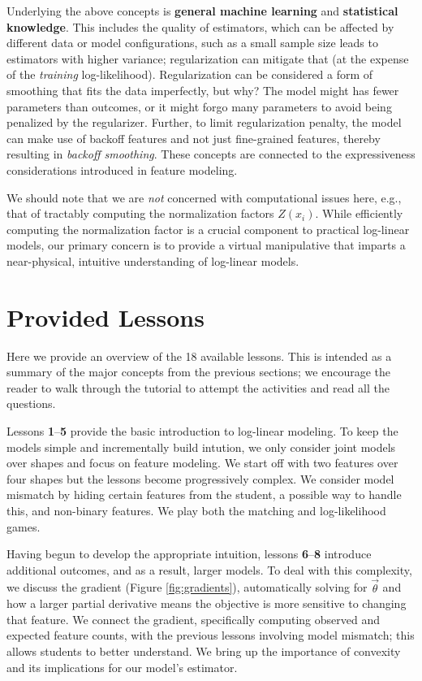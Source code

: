 \documentclass[11pt,letterpaper]{article}
\newcommand{\Note}[1]{}
\renewcommand{\Note}[1]{\hl{[#1]}}  %
\newcommand{\NoteSigned}[3]{{\sethlcolor{#2}\Note{#1: #3}}}
\newcommand{\NoteFF}[1]{\NoteSigned{FF}{LightBlue}{#1}}
\newcommand{\NumLessons}[0]{18}%
\begin{document}
Underlying the above concepts is \textbf{general machine learning} and 
\textbf{statistical knowledge}. This includes the quality of estimators, 
which can be affected by different data or model configurations, such 
as a small sample size leads to estimators with 
higher variance; regularization can mitigate that (at the expense of 
the \textit{training} log-likelihood). 
Regularization can be considered a form of smoothing that fits the data 
imperfectly, but why? The model might has fewer parameters than 
outcomes, or it might forgo many parameters to avoid being penalized by 
the regularizer.  Further, to limit regularization penalty, the model can make 
use of backoff features and not just fine-grained features, thereby resulting 
in \textit{backoff smoothing}. These concepts are connected to the expressiveness 
considerations introduced in feature modeling.

We should note that we are \textit{not} concerned with computational issues here, e.g., that of tractably computing the normalization factors $Z(x_i)$. While efficiently computing the normalization factor is a crucial component to practical log-linear models, our primary concern is to provide a virtual manipulative that imparts a near-physical, intuitive understanding of log-linear models. 



\section{Provided Lessons}\label{sec:lessons}
Here we provide an overview of the \NumLessons{} available lessons. This is intended as a 
summary of the major concepts from the previous sections; we encourage the reader to 
walk through the tutorial to attempt the activities and read all the questions.

Lessons \textbf{1}--\textbf{5} provide the basic introduction to log-linear modeling. To keep 
the models simple and incrementally build intution, we only consider joint models over shapes and focus 
on feature modeling. We start off with two features over four shapes but the lessons 
become progressively complex. We consider model mismatch by hiding certain 
features from the student, a possible way to handle this, and non-binary features. We play both the 
matching and log-likelihood games.

Having begun to develop the appropriate intuition, lessons \textbf{6}--\textbf{8} introduce 
additional outcomes, and as a result, larger models. To deal with this complexity, we discuss the gradient 
(Figure \ref{fig:gradients}), 
automatically solving for $\vec{\theta}$ and how a larger partial derivative means the objective is more 
sensitive to changing that feature. We connect the gradient, specifically computing observed and expected feature 
counts, with the previous lessons involving model mismatch; this allows students to better understand. 
We bring up the importance of convexity and its implications for our model's estimator.
\end{document}
